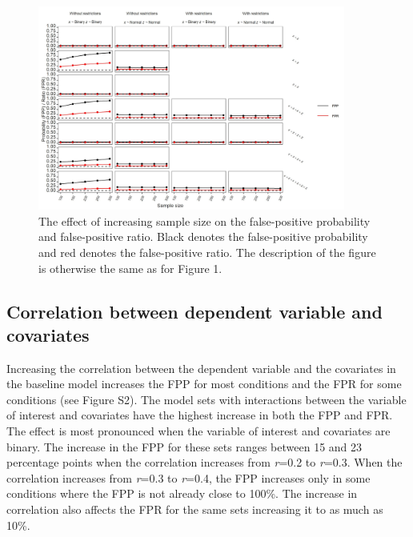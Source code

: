 \begin{figure}[hbt!]
\includegraphics[width=0.9\textwidth]{R/Analysis/Result/Figures/Figure1D.jpeg}
\centering
\caption{The effect of increasing sample size on the false-positive probability and false-positive ratio. Black denotes the false-positive probability and red denotes the false-positive ratio. The description of the figure is otherwise the same as for Figure 1.}
\label{fig:mainfigure}
\end{figure}

\subsection{Correlation between dependent variable and covariates}
Increasing the correlation between the dependent variable and the covariates in the baseline model increases the FPP for most conditions and the FPR for some conditions (see Figure S2). The model sets with interactions between the variable of interest and covariates have the highest increase in both the FPP and FPR. The effect is most pronounced when the variable of interest and covariates are binary. The increase in the FPP for these sets ranges between 15 and 23 percentage points when the correlation increases from \textit{r}=0.2 to \textit{r}=0.3. When the correlation increases from \textit{r}=0.3 to \textit{r}=0.4, the FPP increases only in some conditions where the FPP is not already close to 100\%. The increase in correlation also affects the FPR for the same sets increasing it to as much as 10\%. 